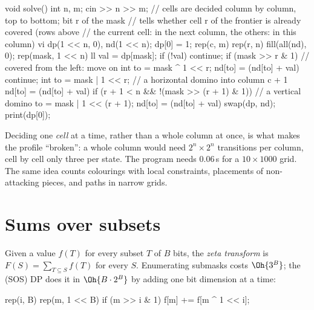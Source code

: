\begin{code}
void solve() {
    int n, m;
    cin >> n >> m;
    // cells are decided column by column, top to bottom; bit r of the mask
    // tells whether cell r of the frontier is already covered (rows above
    // the current cell: in the next column, the others: in this column)
    vi dp(1 << n, 0), nd(1 << n);
    dp[0] = 1;
    rep(c, m) rep(r, n) {
        fill(all(nd), 0);
        rep(mask, 1 << n) {
            ll val = dp[mask];
            if (!val) continue;
            if (mask >> r & 1) {  // covered from the left: move on
                int to = mask ^ 1 << r;
                nd[to] = (nd[to] + val) %
                continue;
            }
            int to = mask | 1 << r;  // a horizontal domino into column c + 1
            nd[to] = (nd[to] + val) %
            if (r + 1 < n && !(mask >> (r + 1) & 1)) {  // a vertical domino
                to = mask | 1 << (r + 1);
                nd[to] = (nd[to] + val) %
            }
        }
        swap(dp, nd);
    }
    print(dp[0]);
}
\end{code}


Deciding one \emph{cell} at a time, rather than a whole column at once, is what makes the profile ``broken'': a whole column would
need $2^n \times 2^n$ transitions per column, cell by cell only three per state. The program needs 0.06\,s for a $10 \times 1000$
grid. The same idea counts colourings with local constraints, placements of non-attacking pieces, and paths in narrow grids.

\section[Sums over subsets]{Sums over subsets \hfill \plat}\label{sec:sosdp}

Given a value $f(T)$ for every subset $T$ of $B$ bits, the \emph{zeta transform} is $F(S) = \sum_{T \subseteq S} f(T)$ for every
$S$. Enumerating submasks costs $\Oh{3^B}$; the  (SOS) DP does it in $\Oh{B \cdot 2^B}$ by adding one bit
dimension at a time:
\begin{code}
rep(i, B) rep(m, 1 << B)
    if (m >> i & 1) f[m] += f[m ^ 1 << i];
\end{code}

